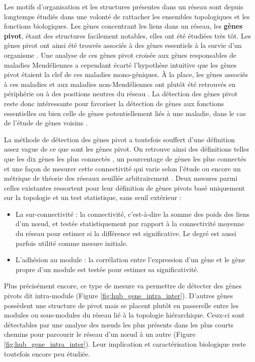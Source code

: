 Les motifs d'organisation et les structures présentes dans un réseau sont depuis longtemps étudiés dans une volonté de rattacher les ensembles topologiques et les fonctions biologiques. Les gènes concentrant les liens dans un réseau, les \textbf{gènes pivot}, étant des structures facilement notables, elles ont été étudiées très tôt. Les gènes pivot ont ainsi été trouvés associés à des gènes essentiels à la survie d'un organisme \cite{Jeong2001May}. Une analyse de ces gènes pivot croisée aux gènes responsables de maladies Mendéliennes a cependant écarté l'hypothèse intuitive que les gènes pivot étaient la clef de ces maladies mono-géniques\cite{Goh2007May}. À la place, les gènes associés à ces maladies et aux maladies non-Mendéliennes ont plutôt été retrouvés en périphérie ou à des positions neutres du réseau \cite{Jeong2001May}. La détection des gènes pivot reste donc intéressante pour favoriser la détection de gènes aux fonctions essentielles ou bien celle de gènes potentiellement liés à une maladie, dans le cas de l'étude de gènes voisins \cite{Langfelder2013}.

La méthode de détection des gènes pivot a toutefois souffert d'une définition assez vague de ce que sont les gènes pivot. On retrouve ainsi des définitions telles que les dix gènes les plus connectés \cite{Russo2018}, un pourcentage de gènes les plus connectés et une façon de mesurer cette connectivité qui varie selon l'étude \cite{Sundarrajan2016, Tang2018} ou encore un métrique de théorie des réseaux seuillée arbitrairement \cite{Saha2017}. Deux mesures parmi celles existantes ressortent pour leur définition de gènes pivots basé uniquement sur la topologie et un test statistique, sans seuil extérieur :
\begin{itemize}
    \item La sur-connectivité \cite{Das2017} : la connectivité, c’est-à-dire la somme des poids des liens d'un nœud, et testée statistiquement par rapport à la connectivité moyenne du réseau pour estimer si la différence est significative. Le degré est aussi parfois utilité comme mesure initiale.
    \item L'adhésion au module \cite{Horvath2008} : la corrélation entre l'expression d'un gène et le gène propre d'un module est testée pour estimer sa significativité.
\end{itemize}

Plus précisément encore, ce type de mesure va permettre de détecter des gènes pivots dit intra-module (Figure \ref{fig:hub_gene_intra_inter}). D'autres gènes possèdent une structure de pivot mais se placent plutôt en passerelle entre les modules ou sous-modules du réseau lié à la topologie hiérarchique. Ceux-ci sont détectables par une analyse des nœuds les plus présents dans les plus courts chemins pour parcourir le réseau d'un nœud à un autre (Figure \ref{fig:hub_gene_intra_inter}). Leur implication et caractérisation biologique reste toutefois encore peu étudiée.

